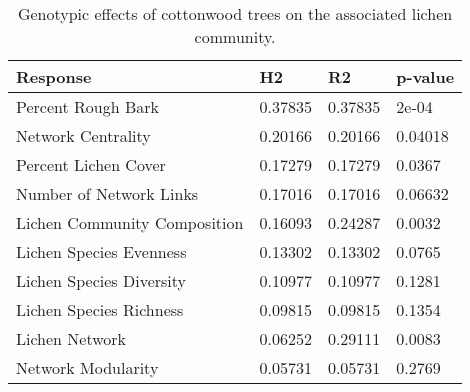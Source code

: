 \begin{table}[ht]
\centering
\begin{tabular}{llll}
  \hline
Response & H2 & R2 & p-value \\ 
  \hline
Percent Rough Bark & 0.37835 & 0.37835 & 2e-04 \\ 
  Network Centrality & 0.20166 & 0.20166 & 0.04018 \\ 
  Percent Lichen Cover & 0.17279 & 0.17279 & 0.0367 \\ 
  Number of Network Links & 0.17016 & 0.17016 & 0.06632 \\ 
  Lichen Community Composition & 0.16093 & 0.24287 & 0.0032 \\ 
  Lichen Species Evenness & 0.13302 & 0.13302 & 0.0765 \\ 
  Lichen Species Diversity & 0.10977 & 0.10977 & 0.1281 \\ 
  Lichen Species Richness & 0.09815 & 0.09815 & 0.1354 \\ 
  Lichen Network & 0.06252 & 0.29111 & 0.0083 \\ 
  Network Modularity & 0.05731 & 0.05731 & 0.2769 \\ 
   \hline
\end{tabular}
\caption{Genotypic effects of cottonwood trees on the associated lichen community.} 
\label{tab:h2_table}
\end{table}
